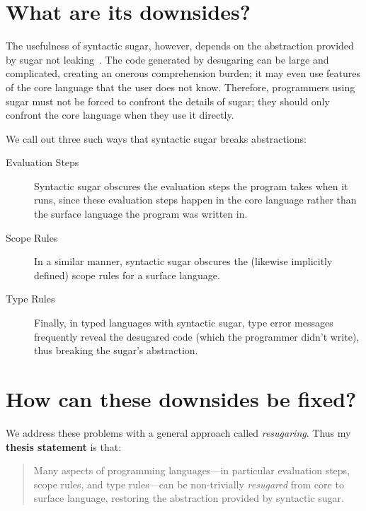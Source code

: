 \section{What are its downsides?}

The usefulness of syntactic sugar, however, depends on the abstraction
provided by sugar not leaking~\cite{leaky-abstractions}.  The code
generated by desugaring can be large and complicated, creating an
onerous comprehension burden; it may even use features of the core
language that the user does not know. Therefore, programmers using
sugar must not be forced to confront the details of sugar; they should
only confront the core language when they use it directly.

We call out three such ways that syntactic sugar breaks abstractions:

\begin{description}
\item[Evaluation Steps] Syntactic sugar obscures the evaluation steps
  the program takes when it runs, since these evaluation steps happen
  in the core language rather than the surface language the program
  was written in.
\item[Scope Rules] In a similar manner, syntactic sugar obscures the
  (likewise implicitly defined) scope rules for a surface language.
\item[Type Rules] Finally, in typed languages with syntactic sugar,
  type error messages frequently reveal the desugared code (which the
  programmer didn't write), thus breaking the sugar's abstraction.
\end{description}

\section{How can these downsides be fixed?}

We address these problems with a general approach called
\emph{resugaring}. Thus my \textbf{thesis statement} is that:
\begin{quote}
Many aspects of programming languages---in particular evaluation
steps, scope rules, and type rules---can be non-trivially
\emph{resugared} from core to surface language, restoring the
abstraction provided by syntactic sugar.
\end{quote}

